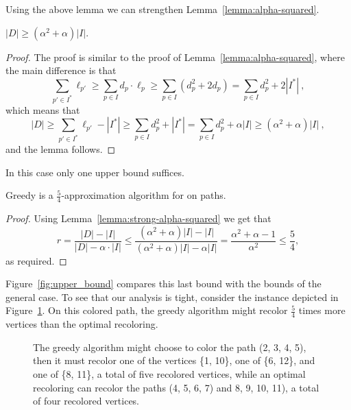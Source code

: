 Using the above lemma we can strengthen
Lemma~\ref{lemma:alpha-squared}.

\begin{lemma}
\label{lemma:strong-alpha-squared}
$|D| \geq (\alpha^2+\alpha)|I|$.
\end{lemma}
\begin{proof}
The proof is similar to the proof of Lemma~\ref{lemma:alpha-squared},
where the main difference is that
\[
\sum_{p' \in I^*} \ell_{p'}
\geq \sum_{p \in I} d_p \cdot \ell_p
\geq \sum_{p \in I} (d_p^2 + 2d_p)
=    \sum_{p \in I} d_p^2 + 2|I^*|
~,
\]
which means that 
\[
|D| 
\geq \sum_{p' \in I^*} \ell_{p'} - |I^*|
\geq \sum_{p \in I} d_p^2 + |I^*|
=    \sum_{p \in I} d_p^2 + \alpha |I|
\geq (\alpha^2 + \alpha) |I|
~,
\]
and the lemma follows.
{}\end{proof}

In this case only one upper bound suffices.

\begin{theorem}
Greedy is a $\frac{5}{4}$-approximation algorithm for
\TWOCR{} on paths.
\end{theorem}
\begin{proof}
Using Lemma~\ref{lemma:strong-alpha-squared} we get that
\[
r	=    
\frac{|D| - |I|}{|D| - \alpha \cdot |I|}
\leq 
\frac{
	(\alpha^2 + \alpha)|I| - |I|
}{
	(\alpha^2 + \alpha)|I| - \alpha |I|
}
=    \frac{\alpha^2 + \alpha - 1}{\alpha^2}
\leq \frac{5}{4}
,
\]
as required.
{}\end{proof}

Figure~\ref{fig:upper_bound} compares this last bound with the bounds of the general case. 
To see that our analysis is tight, consider the instance depicted in
Figure~\ref{fig:tight_path}. On this colored path, the greedy algorithm might
recolor $\frac{5}{4}$ times more vertices than the optimal recoloring.


\begin{figure}[t]
\centering

\caption{
The greedy algorithm might choose to color the path (2, 3, 4, 5), 
then it must recolor one of the vertices \{1, 10\}, 
one of \{6, 12\}, 
and one of \{8, 11\}, 
a total of five recolored vertices,
while an optimal recoloring can recolor the paths (4, 5, 6, 7) and
8, 9, 10, 11), a total of four recolored vertices.}
\label{fig:tight_path}
\end{figure}
